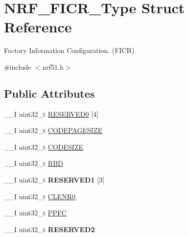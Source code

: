 \hypertarget{struct_n_r_f___f_i_c_r___type}{}\section{N\+R\+F\+\_\+\+F\+I\+C\+R\+\_\+\+Type Struct Reference}
\label{struct_n_r_f___f_i_c_r___type}


Factory Information Configuration. (F\+I\+C\+R)  




{\ttfamily \#include $<$nrf51.\+h$>$}

\subsection*{Public Attributes}
\begin{DoxyCompactItemize}
\item 
\+\_\+\+\_\+\+I uint32\+\_\+t \hyperlink{struct_n_r_f___f_i_c_r___type_a5d4c0414d6e575ba04fa6b489dbe8528}{R\+E\+S\+E\+R\+V\+E\+D0} \mbox{[}4\mbox{]}
\item 
\+\_\+\+\_\+\+I uint32\+\_\+t \hyperlink{struct_n_r_f___f_i_c_r___type_ac09569632c69bcb6aeaf676570155be6}{C\+O\+D\+E\+P\+A\+G\+E\+S\+I\+Z\+E}
\item 
\+\_\+\+\_\+\+I uint32\+\_\+t \hyperlink{struct_n_r_f___f_i_c_r___type_aea8a0e7bddd315005d82634f713e966e}{C\+O\+D\+E\+S\+I\+Z\+E}
\item 
\+\_\+\+\_\+\+I uint32\+\_\+t \hyperlink{struct_n_r_f___f_i_c_r___type_a09118e53ffcc47a71daff4b1c3764d48}{R\+B\+D}
\item 
\hypertarget{struct_n_r_f___f_i_c_r___type_ae567f5f70be995d109141b397fafd4b8}{}\+\_\+\+\_\+\+I uint32\+\_\+t {\bfseries R\+E\+S\+E\+R\+V\+E\+D1} \mbox{[}3\mbox{]}\label{struct_n_r_f___f_i_c_r___type_ae567f5f70be995d109141b397fafd4b8}

\item 
\+\_\+\+\_\+\+I uint32\+\_\+t \hyperlink{struct_n_r_f___f_i_c_r___type_a543bf7dabd8aae999a7d405afbcd64fa}{C\+L\+E\+N\+R0}
\item 
\+\_\+\+\_\+\+I uint32\+\_\+t \hyperlink{struct_n_r_f___f_i_c_r___type_abdf3af5cb6894690cd2b2cdbc7ee0b93}{P\+P\+F\+C}
\item 
\hypertarget{struct_n_r_f___f_i_c_r___type_aa0e2ce20e9a9cfbd937dedbb3f14f22c}{}\+\_\+\+\_\+\+I uint32\+\_\+t {\bfseries R\+E\+S\+E\+R\+V\+E\+D2}\label{struct_n_r_f___f_i_c_r___type_aa0e2ce20e9a9cfbd937dedbb3f14f22c}


\end{DoxyCompactItemize}

